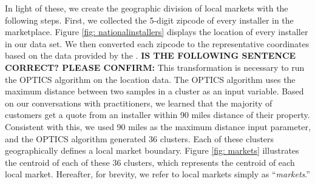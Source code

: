 \documentclass[msom,blindrev]{informs3}
\begin{document}
In light of these, we create the geographic division of local markets with the following steps. First, we collected the 5-digit zipcode of
every installer in the marketplace. Figure \ref{fig: nationalinstallers} displays the location of every installer in our data set. We then converted each zipcode  to the representative coordinates based on the data provided by the \citet{us_census_bureau_2019}. \textbf{IS THE FOLLOWING SENTENCE CORRECT? PLEASE CONFIRM:} This transformation is necessary to run the OPTICS algorithm on the location data. The OPTICS algorithm uses the maximum distance between two samples in a cluster as an input variable. Based on our conversations with practitioners, we learned that the majority of customers get a quote from an installer within 90 miles distance of their property. Consistent with this, we used 90 miles as the maximum distance input parameter, and the OPTICS algorithm generated 36 clusters. Each of these clusters geographically defines a local market boundary. Figure \ref{fig: markets} illustrates the centroid of each of these 36 clusters, which represents the centroid of each local market. Hereafter, for brevity, we refer to local markets simply as ``\emph{markets}.''




\end{document}

